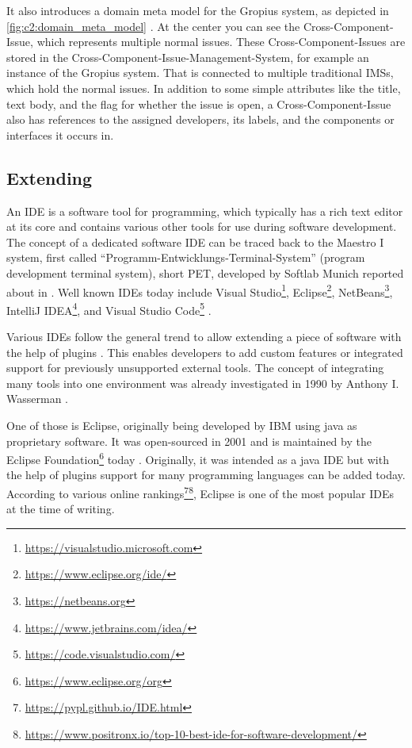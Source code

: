 It also introduces a domain meta model for the \gls{Gropius} system, as depicted in \cref{fig:c2:domain_meta_model} \cite{speth2020gropius}.
At the center you can see the Cross-Component-Issue, which represents multiple normal issues.
These Cross-Component-Issues are stored in the Cross-Component-Issue-Management-System, for example an instance of the \gls{Gropius} system.
That is connected to multiple traditional \glspl{IMS}, which hold the normal issues.
In addition to some simple attributes like the title, text body, and the flag for whether the issue is open, a Cross-Component-Issue also has references to the assigned developers, its labels, and the components or interfaces it occurs in.

\subsection{Extending }
\label{ssec:ch2:ss1.3}
An \gls{IDE} is a software tool for programming, which typically has a rich text editor at its core 
and contains various other tools for use during software development.
The concept of a dedicated software \gls{IDE} can be traced back to the Maestro I system, first called ``Programm-Entwicklungs-Terminal-System'' (program development terminal system), short PET, developed by Softlab Munich reported about in \cite{Computerwoche1975Ide}.
Well known \glspl{IDE} today include Visual Studio\footnote{\url{https://visualstudio.microsoft.com}}, \gls{Eclipse}\footnote{\url{https://www.eclipse.org/ide/}}, NetBeans\footnote{\url{https://netbeans.org}}, IntelliJ IDEA\footnote{\url{https://www.jetbrains.com/idea/}}, and Visual Studio Code\footnote{\url{https://code.visualstudio.com/}} .

Various \glspl{IDE} follow the general trend to allow extending a piece of software with the help of plugins \cite{chang2008issues}.
This enables developers to add custom features or integrated support for previously unsupported external tools.
The concept of integrating many tools into one environment was already investigated in 1990 by Anthony I. Wasserman \cite{wasserman1990tool}.

One of those is \gls{Eclipse}, originally being developed by IBM using \gls{java} as proprietary software.
It was open-sourced in 2001 and is maintained by the Eclipse Foundation\footnote{\url{https://www.eclipse.org/org}}
today \cite{burnette2005eclipse}.
Originally, it was intended as a \gls{java} \gls{IDE} but with the help of plugins support for many programming languages can be added today.
According to various online rankings\footnote{\url{https://pypl.github.io/IDE.html}}\footnote{\url{https://www.positronx.io/top-10-best-ide-for-software-development/}},
\gls{Eclipse} is one of the most popular \glspl{IDE} at the time of writing.

